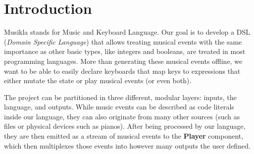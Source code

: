 \documentclass[a4paper,UKenglish,cleveref, autoref]{oasics-v2019}
\title{\ourtitle}
\author{Pedro M. Silva}{Departamento de Informática, Universidade do Minho, Braga, Portugal}{pg38423@alunos.uminho.pt}{}{}
\author{José João Almeida}%
       {Algoritmi, Departamento de Informática, Universidade do Minho, Braga, Portugal}%
       {jj@di.uminho.pt}%
       {https://orcid.org/0000-0002-0722-2031}
       {}
\begin{document}
\maketitle

\begin{abstract}
  In this paper, we'll discuss a simple approach to integrating musical events, such as notes or chords, into a programming language. This means treating music sequences as a first class citizen. It will be possible to save those sequences into variables or play them right away, pass them into functions or apply operators on them (like transposing or repeating the sequence). Furthermore, instead of just allowing static sequences to be generated, we'll integrate a music keyboard system that easily allows the user to bind keys (or other kinds of events) to expressions. Finally, it is important to provide the user with multiple and extensible ways of outputing their music, such as synthesizing it into a file or directly into the speakers, or writing a MIDI or music sheet file. We'll structure this paper first with an analysis of the problem and its particular requirements. Then we will discuss the solution we developed to meet those requirements. Finally we'll analyze the result and discuss possible alternative routes we could've taken.
\end{abstract}

\section{Introduction}
Musikla stands for Music and Keyboard Language. Our goal is to develop a DSL (\textit{Domain Specific Language}) that allows treating musical events with the same importance as other basic types, like integers and booleans, are treated in most programming languages. More than generating these musical events offline, we want to be able to easily declare keyboards that map keys to expressions that either mutate the state or play musical events (or even both).

The project can be partitioned in three different, modular layers: inputs, the language, and outputs. While music events can be described as code literals inside our language, they can also originate from many other sources (such as files or physical devices such as pianos). After being processed by our language, they are then emitted as a stream of musical events to the \textbf{Player} component, which then multiplexes those events into however many outputs the user defined.
\end{document}
